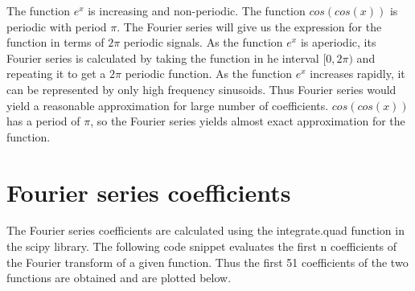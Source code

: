 \documentclass[11pt, a4paper]{article}
\begin{document}
The function $e^x$ is increasing and non-periodic. The function $cos(cos(x))$ is periodic with period $\pi$. 
The Fourier series will give us the expression for the function in terms of $2\pi$ periodic signals. As the function $e^x$ is aperiodic, its Fourier series is calculated by taking the function in he interval $[0, 2\pi)$ and repeating it to get a $2\pi$ periodic function. As the function $e^x$ increases rapidly, it can be represented by only high frequency sinusoids. Thus Fourier series would yield a reasonable approximation for large number of coefficients.
$cos(cos(x))$ has a period of $\pi$, so the Fourier series yields almost exact approximation for the function.

\section{Fourier series coefficients}

The Fourier series coefficients are calculated using the integrate.quad function in the scipy library. The following code snippet evaluates the first n coefficients of the Fourier transform of a given function. Thus the first 51 coefficients of the two functions are obtained and are plotted below.

 
 
\end{document}

